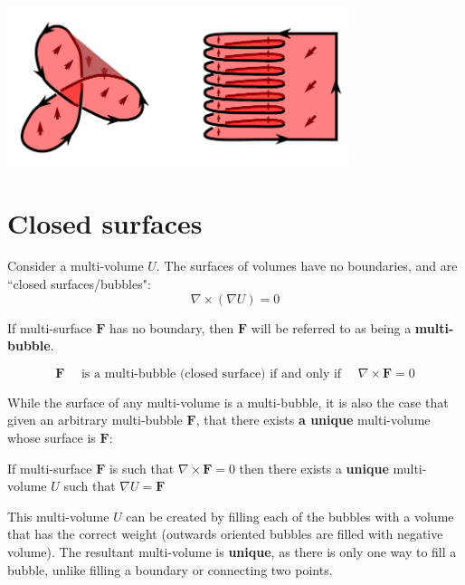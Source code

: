 \begin{center}
\includegraphics[width = 0.75\textwidth]{Boundaries/Surface_boundaries/exotic_surface_filling_examples}
\end{center}




\section{Closed surfaces}\label{sec:closed_surfaces}

Consider a multi-volume \(U\). The surfaces of volumes have no boundaries, and are ``closed surfaces/bubbles":
\[\nabla \times (\nabla U) = 0\]    

If multi-surface \(\mathbf{F}\) has no boundary, then \(\mathbf{F}\) will be referred to as being a {\bf multi-bubble}.

\[\mathbf{F} \quad\text{ is a multi-bubble (closed surface) if and only if }\quad \nabla \times \mathbf{F} = 0\]

While the surface of any multi-volume is a multi-bubble, it is also the case that given an arbitrary multi-bubble \(\mathbf{F}\), that there exists {\bf a unique} multi-volume whose surface is \(\mathbf{F}\):

\begin{thm}\label{thm:filling_closed_surfaces}
If multi-surface \(\mathbf{F}\) is such that \(\nabla \times \mathbf{F} = 0\)
then there exists a {\bf unique} multi-volume \(U\) such that \(\nabla U = \mathbf{F}\)
\end{thm}

This multi-volume \(U\) can be created by filling each of the bubbles with a volume that has the correct weight (outwards oriented bubbles are filled with negative volume). The resultant multi-volume is {\bf unique}, as there is only one way to fill a bubble, unlike filling a boundary or connecting two points.



